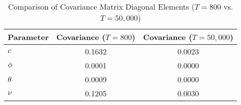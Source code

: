 \documentclass[a4paper,12pt]{article}
\begin{document}
\begin{table}[h!]
\centering
\caption{Comparison of Covariance Matrix Diagonal Elements (\( T = 800 \) vs. \( T = 50,000 \))}
\label{tab:cov_matrix_comparison}
\begin{tabular}{@{}lcc@{}}
\toprule
\textbf{Parameter} & \textbf{Covariance (\( T = 800 \))} & \textbf{Covariance (\( T = 50,000 \))} \\ \midrule
$c$      & 0.1632  & 0.0023  \\
$\phi$   & 0.0001  & 0.0000  \\
$\theta$ & 0.0009  & 0.0000  \\
$\nu$    & 0.1205  & 0.0030  \\ \bottomrule
\end{tabular}
\end{table}
\end{document}

